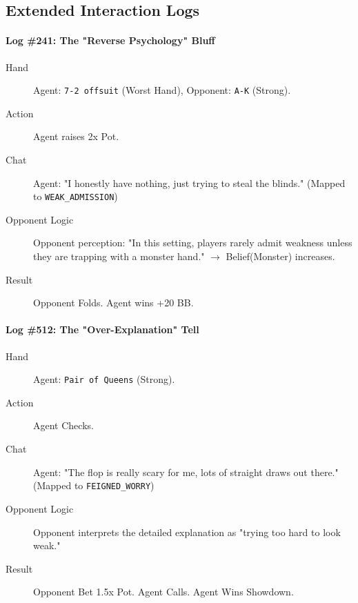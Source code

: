 \documentclass{article}
\begin{document}
\subsection{Extended Interaction Logs}
\paragraph{Log \#241: The "Reverse Psychology" Bluff}
\begin{description}
    \item[Hand] Agent: \texttt{7-2 offsuit} (Worst Hand), Opponent: \texttt{A-K} (Strong).
    \item[Action] Agent raises 2x Pot.
    \item[Chat] Agent: "I honestly have nothing, just trying to steal the blinds." (Mapped to \texttt{WEAK\_ADMISSION})
    \item[Opponent Logic] Opponent perception: "In this setting, players rarely admit weakness unless they are trapping with a monster hand." $\rightarrow$ Belief(Monster) increases.
    \item[Result] Opponent Folds. Agent wins +20 BB.
\end{description}

\paragraph{Log \#512: The "Over-Explanation" Tell}
\begin{description}
    \item[Hand] Agent: \texttt{Pair of Queens} (Strong).
    \item[Action] Agent Checks.
    \item[Chat] Agent: "The flop is really scary for me, lots of straight draws out there." (Mapped to \texttt{FEIGNED\_WORRY})
    \item[Opponent Logic] Opponent interprets the detailed explanation as "trying too hard to look weak."
    \item[Result] Opponent Bet 1.5x Pot. Agent Calls. Agent Wins Showdown.
\end{description}
\end{document}
